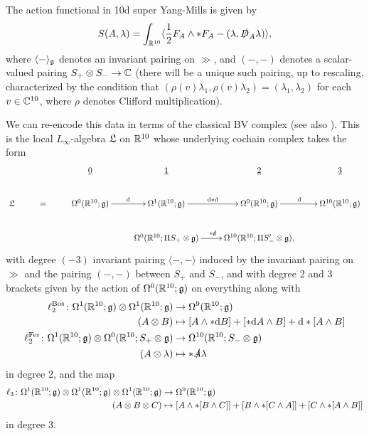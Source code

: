 \documentclass[10pt, oneside]{article}
\def\<{\langle}
\def\>{\rangle}
\begin{document}
\begin{rmk}
The action functional in 10d super Yang-Mills is given by
\[S(A,\lambda) = \int_{\mathbb R^{10}} \langle \frac{1}{2} F_A \wedge \ast F_A - (\lambda, \slashed{D}_A \lambda)\rangle,\]
where $\langle - \rangle_\mathfrak g$ denotes an invariant pairing on $\gg$, and $(-,-)$ denotes a scalar-valued pairing $S_+ \otimes S_- \to \mathbb C$ (there will be a unique such pairing, up to rescaling, characterized by the condition that $(\rho(v)\lambda_1,\rho(v)\lambda_2) = (\lambda_1,\lambda_2)$ for each $v \in \mathbb C^{10}$, where $\rho$ denotes Clifford multiplication). 

We can re-encode this data in terms of the classical BV complex (see also \cite[Section 3.1]{ElliottYoo1}).  
This is the local $L_\infty$-algebra $\mathfrak L$ on $\mathbb R^{10}$ whose underlying cochain complex takes the form
\[
\xymatrix{
& & \ul{0} & \ul{1} & \ul{2} & \ul{3} \\
\fL & = & \Omega^0(\RR^{10}; \gg) \ar[r]^{\d} &\Omega^1(\RR^{10}; \gg) \ar[r]^{\d \ast \d} &\Omega^9(\RR^{10}; \gg) \ar[r]^{\d} &\Omega^{10}(\RR^{10}; \gg) \\
& & &\Omega^0(\RR^{10}; \Pi S_+ \otimes \gg) \ar[r]^{\ast \sd \d} &\Omega^{10}(\RR^{10}; \Pi S'_- \otimes \gg), &
}\]
with degree $(-3)$ invariant pairing $\<-,-\>$ induced by the invariant pairing on $\gg$ and the pairing $(-,-)$ between $S_+$ and $S_-$, and with degree 2 and 3 brackets given by the action of $\Omega^0(\mathbb R^{10}; \mathfrak{g})$ on everything along with
\begin{align*}
\ell_2^{\mathrm{Bos}} \colon \Omega^1(\mathbb R^{10};\mathfrak{g}) \otimes \Omega^1(\mathbb R^{10};\mathfrak{g}) &\to \Omega^{9}(\mathbb R^{10};\mathfrak{g}) \\
(A \otimes B) &\mapsto [A \wedge \ast \mathrm{d} B] + [\ast \mathrm{d}  A \wedge B] + \mathrm{d} \ast[A \wedge B] \\
\ell_2^{\mathrm{Fer}} \colon \Omega^1(\mathbb R^{10};\mathfrak{g}) \otimes \Omega^0(\mathbb R^{10}; S_{+} \otimes \mathfrak{g}) &\to \Omega^{10}(\mathbb R^{10}; S_{-} \otimes \mathfrak{g}) \\
(A \otimes \lambda) &\mapsto \ast \slashed{A} \lambda
\end{align*}
in degree 2, and the map
\begin{align*}
\ell_3 \colon \Omega^1(\mathbb R^{10};\mathfrak{g}) \otimes \Omega^1(\mathbb R^{10};\mathfrak{g}) \otimes \Omega^1(\mathbb R^{10};\mathfrak{g}) &\to \Omega^{9}(\mathbb R^{10};\mathfrak{g}) \\
(A \otimes B \otimes C) &\mapsto [A \wedge \ast[B \wedge C]] + [B \wedge \ast[C \wedge A]] + [C \wedge \ast[A \wedge B]]
\end{align*}
in degree 3.


\end{rmk}
\end{document}
